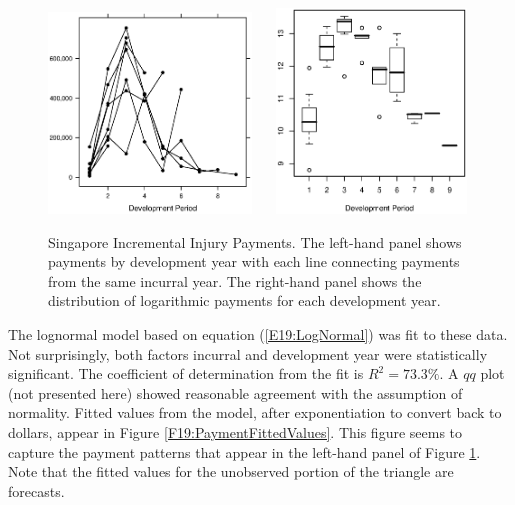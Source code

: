 \begin{figure}[htp]
  \includegraphics[width=0.48\textwidth]{Chapter19Triangles/F19PaymentMTimeSeries.eps}
  \hfill
    $~~~~~$
   \includegraphics[width=0.45\textwidth]{Chapter19Triangles/F19PaymentBoxPlotLog.eps}
  \caption{\label{F19:Payments} \small {Singapore Incremental
Injury Payments. The left-hand panel shows payments by development
year with each line connecting payments from the same incurral year.
The right-hand panel shows the distribution of logarithmic payments
for each development year.}}
\end{figure}
\newpage

The lognormal model based on equation (\ref{E19:LogNormal}) was fit
to these data. Not surprisingly, both factors incurral and
development year were statistically significant. The coefficient of
determination from the fit is $R^2 = 73.3 \%$. A $qq$ plot (not
presented here) showed reasonable agreement with the assumption of
normality. Fitted values from the model, after exponentiation to
convert back to dollars, appear in Figure
\ref{F19:PaymentFittedValues}. This figure seems to capture the
payment patterns that appear in the left-hand panel of Figure
\ref{F19:Payments}. Note that the fitted values for the unobserved
portion of the triangle are forecasts.



